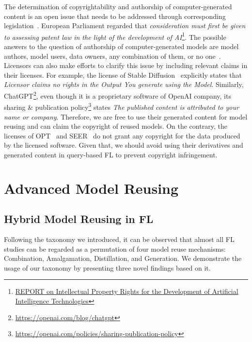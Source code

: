 \documentclass[journal]{IEEEtran}
\begin{document}
The determination of copyrightability and authorship of computer-generated content is an open issue that needs to be addressed through corresponding legislation~\cite{national1979final, hedrick2019ithink, margoni2018artificial}.
European Parliament regarded that \textit{consideration must first be given to assessing patent law in the light of the development of AI}\footnote{\href{https://www.europarl.europa.eu/doceo/document/A-9-2020-0176_EN.html}{REPORT on Intellectual Property Rights for the Development of Artificial Intelligence Technologies}}.
The possible answers to the question of authorship of computer-generated models are model authors, model users, data owners, any combination of them, or no one~\cite{hedrick2019ithink}.
Licensors can also make efforts to clarify this issue by including relevant claims in their licenses.
For example, the license of Stable Diffusion~\cite{rombach2022high} explicitly states that \textit{Licensor claims no rights in the Output You generate using the Model}. 
Similarly, ChatGPT\footnote{\url{https://openai.com/blog/chatgpt}}, even though it is a proprietary software of OpenAI company, its sharing \& publication policy\footnote{\url{https://openai.com/policies/sharing-publication-policy}} states \textit{The published content is attributed to your name or company}.
Therefore, we are free to use their generated content for model reusing and can claim the copyright of reused models.
On the contrary, the licenses of OPT~\cite{zhang2022opt} and SEER~\cite{goyal2022vision} do not grant any copyright for the data produced by the licensed software. 
Given that, we should avoid using their derivatives and generated content in query-based FL to prevent copyright infringement.

\section{Advanced Model Reusing} %
\label{apdx:reusing}
\subsection{Hybrid Model Reusing in FL}

Following the taxonomy we introduced, it can be observed that almost all FL studies can be regarded as a permutation of four model reuse mechanisms: Combination, Amalgamation, Distillation, and Generation.
We demonstrate the usage of our taxonomy by presenting three novel findings based on it.
\end{document}
